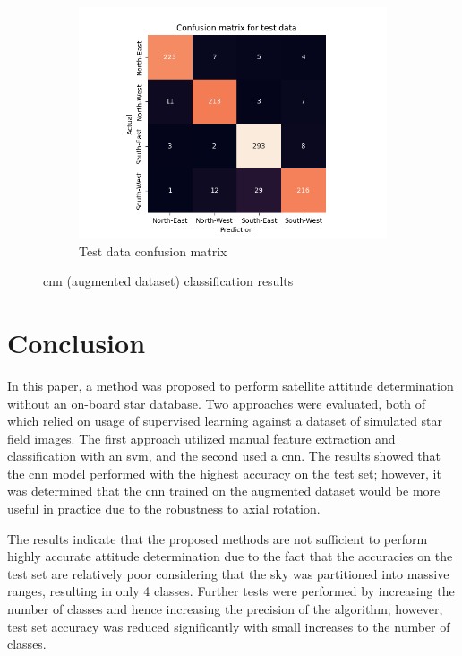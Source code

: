 \documentclass[10pt,twocolumn,letterpaper]{article}
\begin{document}
\begin{figure}[h]
\begin{subfigure}{0.33\linewidth}
    \includegraphics[width=\linewidth, trim={7em, 0em, 9em, 5em}, clip]{cnn_aug_cfsn_test}
    \caption{Test data confusion matrix}
    \label{fig:cnn_test}
  \end{subfigure}
  \caption{\acrshort{cnn} (augmented dataset) classification results}
  \label{fig:cnn_aug_res}
\end{figure}


\section{Conclusion}
\label{sec:conclusion}

In this paper, a method was proposed to perform satellite attitude determination without an on-board star database. Two approaches were evaluated, both of which relied on usage of supervised learning against a dataset of simulated star field images. The first approach utilized manual feature extraction and classification with an \acrshort{svm}, and the second used a \acrshort{cnn}. The results showed that the \acrshort{cnn} model performed with the highest accuracy on the test set; however, it was determined that the \acrshort{cnn} trained on the augmented dataset would be more useful in practice due to the robustness to axial rotation.

The results indicate that the proposed methods are not sufficient to perform highly accurate attitude determination due to the fact that the accuracies on the test set are relatively poor considering that the sky was partitioned into massive ranges, resulting in only 4 classes. Further tests were performed by increasing the number of classes and hence increasing the precision of the algorithm; however, test set accuracy was reduced significantly with small increases to the number of classes.
\end{document}
